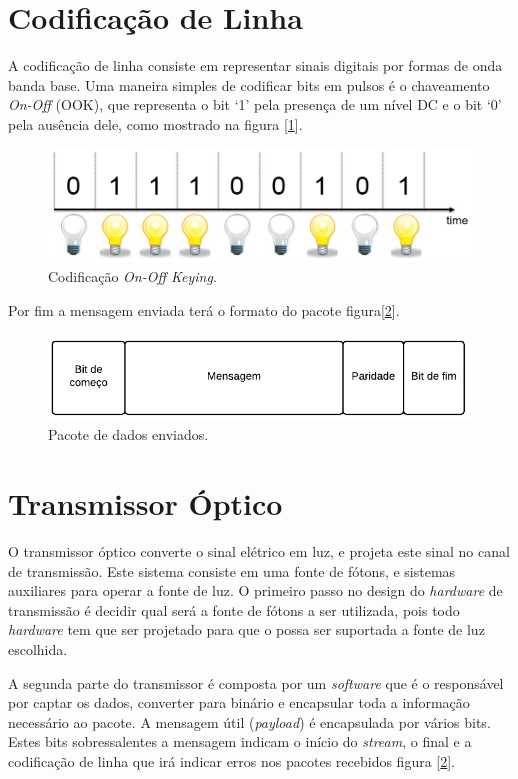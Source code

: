 \section{Codificação de Linha}

A codificação de linha consiste em representar sinais digitais por formas de onda banda base. Uma maneira simples de codificar bits em pulsos é o chaveamento \textit{On-Off} (OOK), que representa o bit \lq 1\rq \: pela presença de um nível DC e o bit \lq 0\rq \: pela ausência dele, como mostrado na figura [\ref{Fig: ook}].

\begin{figure}
	\centering
		\includegraphics[width = 12cm]{figuras/ook}
	\caption{Codificação \textit{On-Off Keying}.}
	\label{Fig: ook}
\end{figure}

Por fim a mensagem enviada terá o formato do pacote figura[\ref{Fig: pacote}].

\begin{figure}
	\centering
		\includegraphics[width = 12cm]{figuras/pacote}
	\caption{Pacote de dados enviados.}
	\label{Fig: pacote}
\end{figure}

\section{Transmissor Óptico}

O transmissor óptico converte o sinal elétrico em luz, e projeta este sinal no canal de transmissão. Este sistema consiste em uma fonte de fótons, e sistemas auxiliares para operar a fonte de luz.
O primeiro passo no design do \textit{hardware} de transmissão é decidir qual será a fonte de fótons a ser utilizada, pois todo \textit{hardware} tem que ser projetado para que o possa ser suportada a fonte de luz escolhida.

A segunda parte do transmissor é composta por um \textit{software} que é o responsável por captar os dados, converter para binário e encapsular toda a informação necessário ao pacote. 
A mensagem útil (\textit{payload}) é encapsulada por vários bits. Estes bits sobressalentes a mensagem indicam o início do \textit{stream}, o final e a codificação de linha que irá indicar erros nos pacotes recebidos figura [\ref{Fig: pacote}].

